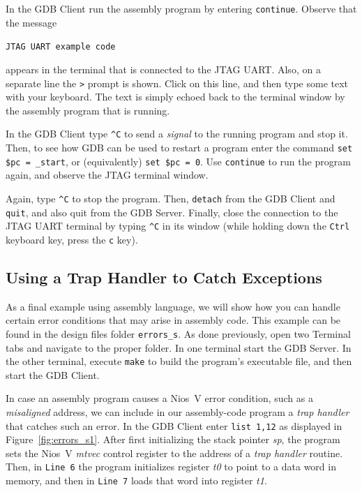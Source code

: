 \documentclass[11pt, twoside, pdftex]{article}
\begin{document}
In the GDB Client run the assembly program by entering \texttt{continue}.
Observe that the message 

\texttt{JTAG UART example code}

appears in the terminal that is connected to the
JTAG UART. Also, on a separate line the \texttt{>} prompt is shown. Click on this line,
and then type some text with your keyboard. The text is simply echoed back to the terminal
window by the assembly program that is running. 

In the GDB Client type \texttt{\textasciicircum C} to send a {\it signal} to the
running program and stop it. Then, to see how GDB can
be used to restart a program enter the command \texttt{set \$pc = \_start}, or
(equivalently) \texttt{set \$pc = 0}. Use \texttt{continue} to run the program again,
and observe the JTAG terminal window. 

Again, type \texttt{\textasciicircum C} to stop the program. Then, \texttt{detach} 
from the GDB Client and \texttt{quit}, and also quit from the GDB Server. Finally, close 
the connection to the JTAG UART terminal by typing \texttt{\textasciicircum C} in its window
(while holding down the \texttt{Ctrl} keyboard key, press the \texttt{c} key).

\subsection{Using a Trap Handler to Catch Exceptions}

As a final example using assembly language, we will show how you can handle certain error
conditions that may arise in assembly code.  This example can be found in the design files folder
\texttt{errors\_s}.  As done previously, open two Terminal tabs and navigate to
the proper folder. In one terminal start the GDB Server. In the other terminal, 
execute \texttt{make} to build the program's executable file, and then start the GDB Client.

In case an assembly program causes a Nios~V error condition, such as a {\it misaligned} address,
we can include in our assembly-code program a {\it trap handler} that catches such an error. 
In the GDB Client enter \texttt{list 1,12} as displayed in Figure~\ref{fig:errors_s1}.
After first initializing the stack pointer {\it sp}, the program sets the Nios~V {\it mtvec}
control register to the address of a {\it trap handler} routine. Then, in \texttt{Line 6} the
program initializes register {\it t0} to point to a data word in memory, and then in
\texttt{Line 7} loads that word into register {\it t1}. 
\end{document}
